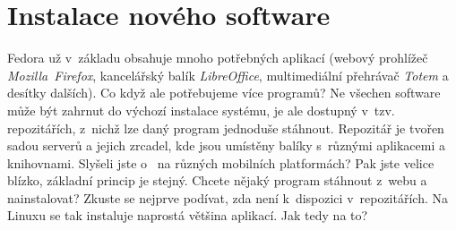 \section*{Instalace nového software}
Fedora už v~základu obsahuje mnoho potřebných aplikací (webový prohlížeč \emph{Mozilla~Firefox}, kancelářský balík \emph{LibreOffice}, multimediální přehrávač \emph{Totem} a desítky dalších). Co když ale potřebujeme více programů? Ne všechen software může být zahrnut do výchozí instalace systému, je ale dostupný v~tzv. repozitářích, z~nichž lze daný program jednoduše stáhnout. Repozitář je tvořen sadou serverů a jejich zrcadel, kde jsou umístěny balíky s~různými aplikacemi a knihovnami. Slyšeli jste o~ na různých mobilních platformách? Pak jste velice blízko, základní princip je stejný. Chcete nějaký program stáhnout z~webu a nainstalovat? Zkuste se nejprve podívat, zda není k~dispozici v~repozitářích. Na Linuxu se tak instaluje naprostá většina aplikací. Jak tedy na to?

\pagebreak

